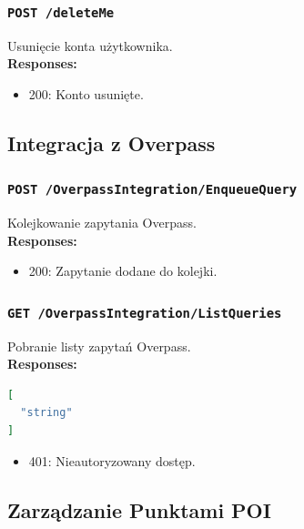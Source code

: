 \subsubsection{\lstinline[language=http]{POST /deleteMe}}
Usunięcie konta użytkownika. \\
\textbf{Responses:}
\begin{itemize}
    \item 200: Konto usunięte.
\end{itemize}

\subsection{Integracja z Overpass}

\subsubsection{\lstinline[language=http]{POST /OverpassIntegration/EnqueueQuery}}
Kolejkowanie zapytania Overpass. \\
\textbf{Responses:}
\begin{itemize}
    \item 200: Zapytanie dodane do kolejki.
\end{itemize}

\subsubsection{\lstinline[language=http]{GET /OverpassIntegration/ListQueries}}
Pobranie listy zapytań Overpass. \\
\textbf{Responses:}
\begin{lstlisting}[language=json]
[
  "string"
]
\end{lstlisting}
\begin{itemize}
    \item 401: Nieautoryzowany dostęp.
\end{itemize}

\subsection{Zarządzanie Punktami POI}

